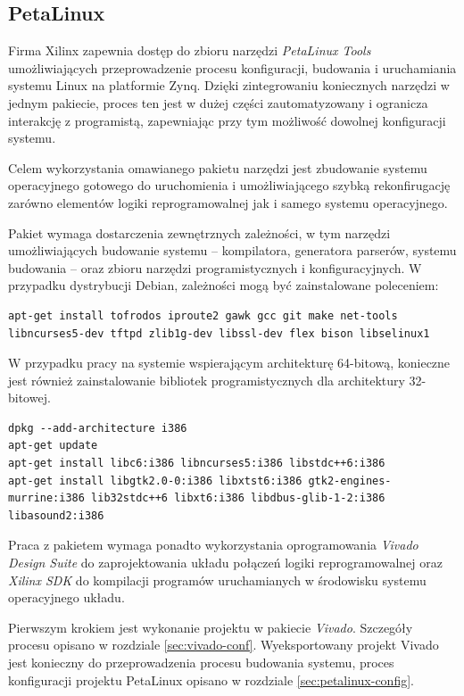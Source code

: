 \subsection{PetaLinux} %

Firma Xilinx zapewnia dostęp do zbioru narzędzi \emph{PetaLinux Tools} \cite{petalinux-tools} umożliwiających przeprowadzenie procesu konfiguracji, budowania i uruchamiania systemu Linux na platformie Zynq. 
Dzięki zintegrowaniu koniecznych narzędzi w jednym pakiecie, proces ten jest w dużej części zautomatyzowany i ogranicza interakcję z programistą, zapewniając przy tym możliwość dowolnej konfiguracji systemu.

Celem wykorzystania omawianego pakietu narzędzi jest zbudowanie systemu operacyjnego gotowego do uruchomienia i umożliwiającego szybką rekonfirugację zarówno elementów logiki reprogramowalnej jak i samego systemu operacyjnego.

Pakiet wymaga dostarczenia zewnętrznych zależności, w tym narzędzi umożliwiających budowanie systemu -- kompilatora, generatora parserów, systemu budowania -- oraz zbioru narzędzi programistycznych i konfiguracyjnych.
W przypadku dystrybucji Debian, zależności mogą być zainstalowane poleceniem:

\begin{lstlisting}[breaklines=true]
apt-get install tofrodos iproute2 gawk gcc git make net-tools libncurses5-dev tftpd zlib1g-dev libssl-dev flex bison libselinux1
\end{lstlisting}

W przypadku pracy na systemie wspierającym architekturę 64-bitową, konieczne jest również zainstalowanie bibliotek programistycznych dla architektury 32-bitowej.

\begin{lstlisting}[breaklines=true]
dpkg --add-architecture i386
apt-get update
apt-get install libc6:i386 libncurses5:i386 libstdc++6:i386
apt-get install libgtk2.0-0:i386 libxtst6:i386 gtk2-engines-murrine:i386 lib32stdc++6 libxt6:i386 libdbus-glib-1-2:i386 libasound2:i386
\end{lstlisting}

Praca z pakietem wymaga ponadto wykorzystania oprogramowania \emph{Vivado Design Suite} \cite{vivado-home} do zaprojektowania układu połączeń logiki reprogramowalnej oraz \emph{Xilinx SDK} \cite{xsdk-home} do kompilacji programów uruchamianych w środowisku systemu operacyjnego układu.

Pierwszym krokiem jest wykonanie projektu w pakiecie \emph{Vivado}. 
Szczegóły procesu opisano w rozdziale \ref{sec:vivado-conf}. %
Wyeksportowany projekt Vivado jest konieczny do przeprowadzenia procesu budowania systemu, proces konfiguracji projektu PetaLinux opisano w rozdziale \ref{sec:petalinux-config}. %

